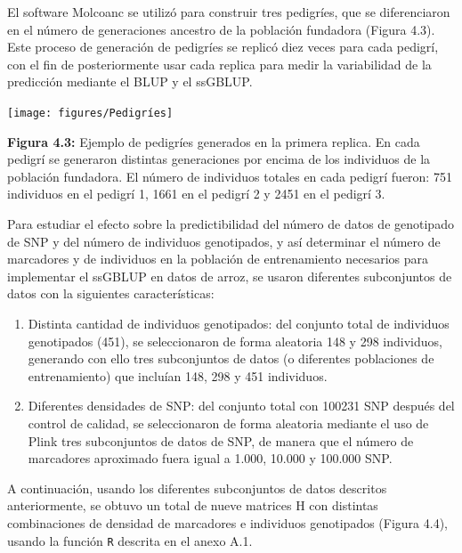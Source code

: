 \documentclass[11pt,spanish,a4paper,oneside,]{book} %
\begin{document}
El software Molcoanc se utilizó para construir tres pedigríes, que se diferenciaron en el número de generaciones ancestro de la población fundadora (Figura 4.3). Este proceso de generación de pedigríes se replicó diez veces para cada pedigrí, con el fin de posteriormente usar cada replica para medir la variabilidad de la predicción mediante el BLUP y el ssGBLUP.

\begin{center}\texttt{[image: figures/Pedigríes]} \end{center}

\begin{center}
\textbf{Figura 4.3:} Ejemplo de pedigríes generados en la primera replica. En cada pedigrí se generaron distintas generaciones por encima de los individuos de la población fundadora. El número de individuos totales en cada pedigrí fueron: 751 individuos en el pedigrí 1, 1661 en el pedigrí 2 y 2451 en el pedigrí 3.

\end{center}

Para estudiar el efecto sobre la predictibilidad del número de datos de genotipado de SNP y del número de individuos genotipados, y así determinar el número de marcadores y de individuos en la población de entrenamiento necesarios para implementar el ssGBLUP en datos de arroz, se usaron diferentes subconjuntos de datos con la siguientes características:

\begin{enumerate}
\def\labelenumi{\arabic{enumi}.}
\item
  Distinta cantidad de individuos genotipados: del conjunto total de individuos genotipados (451), se seleccionaron de forma aleatoria 148 y 298 individuos, generando con ello tres subconjuntos de datos (o diferentes poblaciones de entrenamiento) que incluían 148, 298 y 451 individuos.
\item
  Diferentes densidades de SNP: del conjunto total con 100231 SNP después del control de calidad, se seleccionaron de forma aleatoria mediante el uso de Plink tres subconjuntos de datos de SNP, de manera que el número de marcadores aproximado fuera igual a 1.000, 10.000 y 100.000 SNP.
\end{enumerate}

A continuación, usando los diferentes subconjuntos de datos descritos anteriormente, se obtuvo un total de nueve matrices H con distintas combinaciones de densidad de marcadores e individuos genotipados (Figura 4.4), usando la función \texttt{R} descrita en el anexo A.1.
\end{document}
